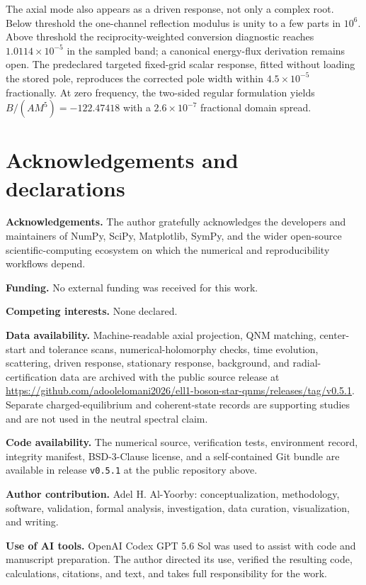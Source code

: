 \documentclass[aps,prd,preprint,onecolumn,nofootinbib,superscriptaddress,showkeys]{revtex4-2}
\newcommand{\code}[1]{\texttt{#1}}
\begin{document}
The axial mode also appears as a driven response, not only a complex root.
Below threshold the one-channel reflection modulus is unity to a few parts in
$10^6$. Above threshold the reciprocity-weighted conversion diagnostic reaches
$1.0114\times10^{-5}$ in the sampled band; a canonical energy-flux derivation
remains open. The predeclared targeted fixed-grid scalar response, fitted without loading the stored pole, reproduces the corrected
pole width within $4.5\times10^{-5}$ fractionally. At zero frequency, the
two-sided regular formulation yields $B/(AM^5)=-122.47418$ with a
$2.6\times10^{-7}$ fractional domain spread.

\section*{Acknowledgements and declarations}

\noindent\textbf{Acknowledgements.} The author gratefully acknowledges the developers and maintainers of NumPy, SciPy, Matplotlib, SymPy, and the wider open-source scientific-computing ecosystem on which the numerical and reproducibility workflows depend.

\noindent\textbf{Funding.} No external funding was received for this work.

\noindent\textbf{Competing interests.} None declared.

\noindent\textbf{Data availability.} Machine-readable axial projection, QNM matching, center-start and tolerance scans, numerical-holomorphy checks, time evolution, scattering, driven response, stationary response, background, and radial-certification data are archived with the public source release at \url{https://github.com/adoolelomani2026/ell1-boson-star-qnms/releases/tag/v0.5.1}. Separate charged-equilibrium and coherent-state records are supporting studies and are not used in the neutral spectral claim.

\noindent\textbf{Code availability.} The numerical source, verification tests, environment record, integrity manifest, BSD-3-Clause license, and a self-contained Git bundle are available in release \code{v0.5.1} at the public repository above.

\noindent\textbf{Author contribution.} Adel H. Al-Yoorby: conceptualization, methodology, software, validation, formal analysis, investigation, data curation, visualization, and writing.

\noindent\textbf{Use of AI tools.} OpenAI Codex GPT 5.6 Sol was used to assist with code and manuscript preparation. The author directed its use, verified the resulting code, calculations, citations, and text, and takes full responsibility for the work.
\end{document}
